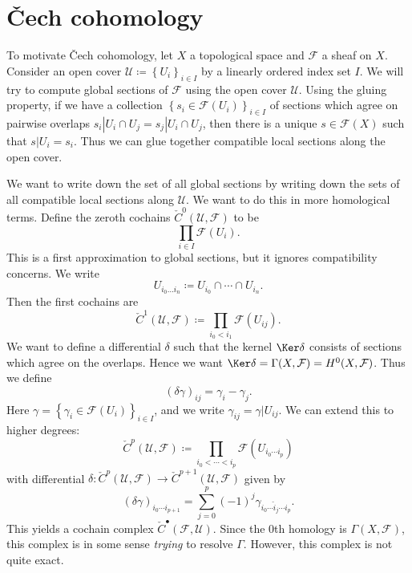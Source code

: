 \section{\v{C}ech cohomology}


To motivate \v{C}ech cohomology, let $X$ a topological space and $\mathcal{F} $ a sheaf on $X$. Consider an open cover $\mathcal{U} \coloneqq \left\{ U_i \right\} _{i\in I} $ by a linearly ordered index set $I$. We will try to compute global sections of $\mathcal{F} $ using the open cover $\mathcal{U} $. Using the gluing property, if we have a collection $\left\{ s_i \in \mathcal{F}(U_i) \right\}_{i\in I} $ of sections which agree on pairwise overlaps $s_i|U_i \cap U_j = s_j|U_i \cap U_j$, then there is a unique $s\in \mathcal{F} (X)$ such that $s|U_i = s_i$. Thus we can glue together compatible local sections along the open cover.

We want to write down the set of all global sections by writing down the sets of all compatible local sections along $\mathcal{U} $. We want to do this in more homological terms. Define the zeroth cochains $\check{C}^0(\mathcal{U} ,\mathcal{F} )$ to be
\[
	\prod_{i\in I} \mathcal{F} (U_i)
.\]
This is a first approximation to global sections, but it ignores compatibility concerns. We write
\[
	U_{i_0 \ldots i_n} \coloneqq U_{i_0} \cap \cdots \cap U_{i_n} 
.\]
Then the first cochains are
\[
	\check{C}^1(\mathcal{U} ,\mathcal{F} )\coloneqq \prod_{i_0 < i_1} \mathcal{F} (U_{ij} )
.\]
We want to define a differential $\delta $ such that the kernel $\Ker \delta $ consists of sections which agree on the overlaps. Hence we want $\Ker \delta = \Gamma (X,\mathcal{F} ) = H^0(X,\mathcal{F} )$. Thus we define
\[
	(\delta \gamma )_{ij} =\gamma _i - \gamma _j
.\]
Here $\gamma =\left\{ \gamma _i\in \mathcal{F} (U_i) \right\}_{i\in I} $, and we write $\gamma _{ij} =\gamma |U_{ij} $. We can extend this to higher degrees:
\[
	\check{C}^p(\mathcal{U} ,\mathcal{F} )\coloneqq \prod_{i_0 < \cdots < i_p} \mathcal{F} (U_{i_0 \cdots i_p} )
\]
with differential $\delta : \check{C}^p(\mathcal{U} ,\mathcal{F} ) \to \check{C}^{p+1} (\mathcal{U} ,\mathcal{F} )$ given by
\[
	(\delta \gamma )_{i_0 \cdots i_{p+1}} =\sum_{j=0}^p (-1)^j \gamma _{i_0 \cdots \widehat{i}_j \cdots i_p} 
.\]
This yields a cochain complex $\check{C}^{\bullet} (\mathcal{F} ,\mathcal{U} )$. Since the 0th homology is $\Gamma (X,\mathcal{F} )$, this complex is in some sense \emph{trying} to resolve $\Gamma $. However, this complex is not quite exact.

